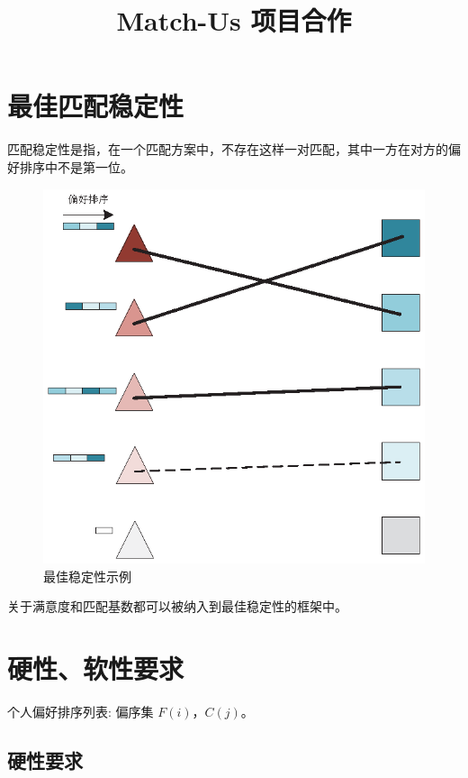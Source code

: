 \documentclass[lang=cn,11pt,a4paper]{elegantpaper}
\title{Match-Us 项目合作}
\author{}
\institute{}
\date{\zhtoday}
\begin{document}
\maketitle



\section{最佳匹配稳定性}

匹配稳定性是指，在一个匹配方案中，不存在这样一对匹配，其中一方在对方的偏好排序中不是第一位。

\begin{figure}[htb]
    \centering
    \includegraphics[scale=1]{favor.eps}
    \caption{最佳稳定性示例}
    \label{fig:my_label}
\end{figure}

关于满意度和匹配基数都可以被纳入到最佳稳定性的框架中。

\section{硬性、软性要求}

个人偏好排序列表: 偏序集 $F(i)$，$C(j)$。

\subsection{硬性要求}
\end{document}
